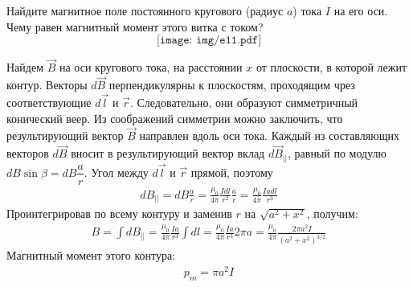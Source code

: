 \documentclass[__main__.tex]{subfiles}
\begin{document}
Найдите магнитное поле постоянного кругового (радиус $a$) тока $I$ на его оси. Чему равен магнитный момент этого витка с током?\\ 

$$
\texttt{[image: img/e11.pdf]}
$$

Найдем $\vec{B}$ на оси кругового тока, на расстоянии $x$ от плоскости, в которой лежит контур. Векторы $d\vec{B}$ перпендикулярны к плоскостям, проходящим чрез соответствующие $d\vec{l}$ и $\vec{r}$. Следовательно, они образуют симметричный конический веер. Из соображений симметрии можно заключить, что результирующий вектор $\vec{B}$ направлен вдоль оси тока. Каждый из составляющих векторов $d\vec{B}$ вносит в результирующий вектор вклад $d\vec{B}_{||}$, равный по модулю $dB\sin\beta=dB\dfrac{a}{r}$. Угол между $d\vec{l}$ и $\vec{r}$ прямой, поэтому 
\begin{gather*}
dB_{||}=dB\frac{a}{r}=\frac{\mu_0}{4\pi}\frac{Idl}{r^2}\frac{a}{r}=\frac{\mu_0}{4\pi}\frac{Iadl}{r^3}
\end{gather*}
Проинтегрировав по всему контуру и заменив $r$ на $\sqrt{a^2+x^2}$, получим:
\begin{gather*}
B=\int dB_{||} = \frac{\mu_0}{4\pi}\frac{Ia}{r^3}\int dl = \frac{\mu_0}{4\pi}\frac{Ia}{r^3} 2\pi a=\frac{\mu_0}{4\pi}\frac{2\pi a^2I}{(a^2+x^2)^{3/2}}
\end{gather*}
Магнитный момент этого контура:
\begin{gather*}
p_m=\pi a^2I
\end{gather*}
\end{document}
